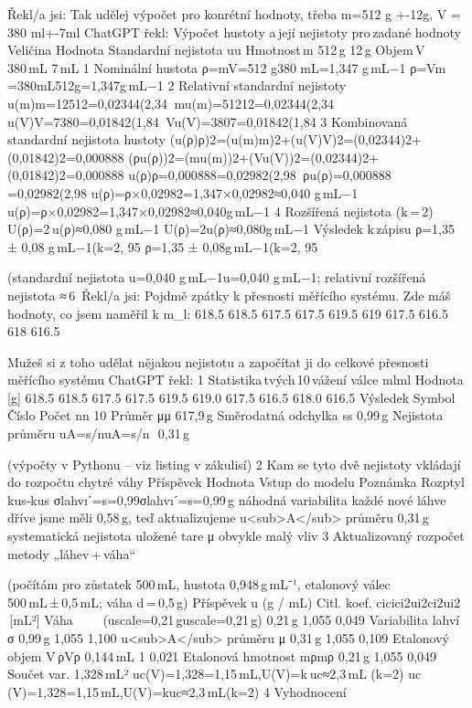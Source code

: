 {Řekl/a jsi:
Tak udělej výpočet pro konrétní hodnoty, třeba m=512 g +-12g, V = 380 ml+-7ml
ChatGPT řekl:
Výpočet hustoty a její nejistoty pro zadané hodnoty
Veličina	Hodnota	Standardní nejistota uu
Hmotnost m	512 g	12 g
Objem V	380 mL	7 mL
1  Nominální hustota
ρ=mV=512  g380  mL=1,347  g mL−1
ρ=Vm​=380mL512g​=1,347g mL−1
2  Relativní standardní nejistoty
u(m)m=12512=0,02344(2,34 %
mu(m)​=51212​=0,02344(2,34%
u(V)V=7380=0,01842(1,84 %
Vu(V)​=3807​=0,01842(1,84%
3  Kombinovaná standardní nejistota hustoty
(u(ρ)ρ)2=(u(m)m)2+(u(V)V)2=(0,02344)2+(0,01842)2=0,000888
(ρu(ρ)​)2=(mu(m)​)2+(Vu(V)​)2=(0,02344)2+(0,01842)2=0,000888
u(ρ)ρ=0,000888=0,02982(2,98 %
ρu(ρ)​=0,000888
​=0,02982(2,98%
u(ρ)=ρ×0,02982=1,347×0,02982≈0,040  g mL−1
u(ρ)=ρ×0,02982=1,347×0,02982≈0,040g mL−1
4  Rozšířená nejistota (k = 2)
U(ρ)=2 u(ρ)≈0,080  g mL−1
U(ρ)=2u(ρ)≈0,080g mL−1
Výsledek k zápisu
ρ=1,35 ± 0,08  g mL−1(k=2, 95%
ρ=1,35 ± 0,08g mL−1(k=2, 95%

(standardní nejistota u=0,040 g mL−1u=0,040 g mL−1; relativní rozšířená nejistota ≈ 6 %
Řekl/a jsi:
Pojdmě zpátky k přesnosti měřícího systému. Zde máš hodnoty, co jsem naměřil k m_l: 618.5
618.5
617.5
617.5
619.5
619
617.5
616.5
618
616.5

Mužeš si z toho udělat nějakou nejistotu a započítat ji do celkové přesnosti měřícího systému
ChatGPT řekl:
1  Statistika tvých 10 vážení válce mlml​
Hodnota [g]
618.5
618.5
617.5
617.5
619.5
619.0
617.5
616.5
618.0
616.5
Výsledek	Symbol	Číslo
Počet	nn	10
Průměr	μμ	617,9 g
Směrodatná odchylka	ss	0,99 g
Nejistota průměru	uA=s/nuA​=s/n
​	0,31 g

(výpočty v Pythonu – viz listing v zákulisí)
2  Kam se tyto dvě nejistoty vkládají do rozpočtu chytré váhy
Příspěvek	Hodnota	Vstup do modelu	Poznámka
Rozptyl kus‑kus	σlahvıˊ=s=0,99σlahvıˊ​=s=0,99 g	náhodná variabilita každé nové láhve	dříve jsme měli 0,58 g, teď aktualizujeme
u<sub>A</sub> průměru	0,31 g	systematická nejistota uložené tare μ	obvykle malý vliv
3  Aktualizovaný rozpočet metody „láhev + váha“

(počítám pro zůstatek 500 mL, hustota 0,948 g mL⁻¹, etalonový válec 500 mL ± 0,5 mL; váha d = 0,5 g)
Příspěvek	u (g / mL)	Citl. koef. cici​	ci2ui2ci2​ui2​ [mL²]
Váha   (uscale=0,21 guscale​=0,21 g)	0,21 g	1,055	0,049
Variabilita lahví σ	0,99 g	1,055	1,100
u<sub>A</sub> průměru μ	0,31 g	1,055	0,109
Etalonový objem V ⁣ρVρ​	0,144 mL	1	0,021
Etalonová hmotnost mρmρ​	0,21 g	1,055	0,049
Součet var.			1,328 mL²
uc(V)=1,328=1,15 mL,U(V)=k uc≈2,3 mL  (k=2)
uc​(V)=1,328
​=1,15 mL,U(V)=kuc​≈2,3 mL(k=2)
4  Vyhodnocení

}

